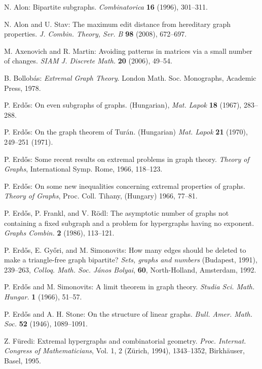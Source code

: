 \documentclass[11pt]{article}
\begin{document}
\begin{thebibliography}{10}
\parskip=0pt
\small

 N. Alon: Bipartite subgraphs.
{\it Combinatorica} {\bf 16} (1996), 301--311.

 N. Alon and U. Stav: %
The maximum edit distance from hereditary graph properties.
{\it J. Combin. Theory, Ser. B} {\bf 98} (2008), %
 672--697.

 M. Axenovich and R. Martin:
Avoiding patterns in matrices via a small number of changes.
{\it SIAM J. Discrete Math.} {\bf 20} (2006), %
49--54.

 B. Bollob\'as: {\it Extremal Graph Theory}. London
Math. Soc. Monographs,  Academic Press, 1978.

 P. Erd\H{o}s:
On even subgraphs of graphs. (Hungarian), {\it Mat. Lapok} {\bf 18} (1967), 283--288.

 P. Erd\H{o}s:
On the graph theorem of Tur\'an. (Hungarian)
{\it Mat. Lapok} {\bf 21} (1970), 249--251 (1971).

 P. Erd\H{o}s:
Some recent results on extremal problems in graph theory.
{\it Theory of Graphs}, International Symp. Rome, 1966, 118--123.

 P. Erd\H{o}s:
On some new inequalities concerning extremal properties
of graphs. {\it Theory of Graphs},
Proc. Coll. Tihany, (Hungary) 1966, 77--81.

 P. Erd\H os, P. Frankl, and V. R\"odl:
The asymptotic number of graphs not containing a fixed subgraph
and a problem for hypergraphs having no exponent.
{\it Graphs Combin.} {\bf 2} (1986), 113--121.

 P. Erd\H os, E. Gy\H ori, and M. Simonovits:
How many edges should be deleted to make a triangle-free graph bipartite?
{\it  Sets, graphs and numbers} (Budapest, 1991), 239--263,
{\it Colloq. Math. Soc. J\'anos Bolyai}, {\bf 60}, North-Holland, Amsterdam, 1992.

 P. Erd\H{o}s and M. Simonovits:
A limit theorem in graph theory.
{\it Studia Sci. Math. Hungar.} {\bf 1} (1966), 51--57.

 P. Erd\H{o}s and A. H. Stone:
On the structure of linear graphs.
{\it Bull. Amer.  Math. Soc.} {\bf 52} (1946), 1089--1091.

 Z. F\"uredi:
Extremal hypergraphs and combinatorial geometry.
{\it Proc. Internat. Congress of Mathematicians},
Vol. 1, 2 (Z\"urich, 1994), 1343--1352, Birkh\"auser, Basel, 1995.


\end{thebibliography}
\end{document}
